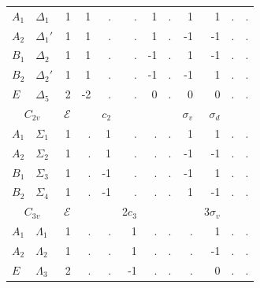 \documentclass[twocolumn,showpacs,preprintnumbers,superscriptaddress,prb,floatfix,aps,10pt]{revtex4-1}
\newcommand*{\id}{\mathcal{E}}
\begin{document}
\begin{table}
\begin{ruledtabular}
\begin{tabular*}{10cm}{llrrrrrrrrrr}
\hline
$A_1$           & $\Delta_{1}  $  &  1  &     1  &     .  &     .  &     1  &   .  &          1  &          1  &          .  &          .  \\         %
$A_2$           & $\Delta_{1}' $  &  1  &     1  &     .  &     .  &     1  &   .  &         -1  &         -1  &          .  &          .  \\         %
$B_1$           & $\Delta_{2}  $  &  1  &     1  &     .  &     .  &    -1  &   .  &          1  &         -1  &          .  &          .  \\         %
$B_2$           & $\Delta_{2}' $  &  1  &     1  &     .  &     .  &    -1  &   .  &         -1  &          1  &          .  &          .  \\         %
$E$             & $\Delta_{5}  $  &  2  &    -2  &     .  &     .  &     0  &   .  &          0  &          0  &          .  &          .  \\ \hline \hline %
\multicolumn{2}{c}{$C_{2v}$}      &$\id$&        &  $c_2$ &        &        &      &  $\sigma_v$ & $\sigma_d$  &             &             \\
\hline
$A_{1}$         & $\Sigma_{1}  $  &  1  &     .  &     1  &     .  &     .  &   .  &          1  &          1  &          .  &          .  \\
$A_{2}$         & $\Sigma_{2}  $  &  1  &     .  &     1  &     .  &     .  &   .  &         -1  &         -1  &          .  &          .  \\
$B_{1}$         & $\Sigma_{3}  $  &  1  &     .  &    -1  &     .  &     .  &   .  &         -1  &          1  &          .  &          .  \\
$B_{2}$         & $\Sigma_{4}  $  &  1  &     .  &    -1  &     .  &     .  &   .  &          1  &         -1  &          .  &          .  \\ \hline \hline
\multicolumn{2}{c}{$C_{3v}$}      &$\id$&        &        & 2$c_3$ &        &      &             & 3$\sigma_v$ &             &             \\
\hline
$A_{1}$         & $\Lambda_{1} $  &  1  &     .  &     .  &     1  &     .  &   .  &          .  &          1  &          .  &          .  \\
$A_{2}$         & $\Lambda_{2} $  &  1  &     .  &     .  &     1  &     .  &   .  &          .  &         -1  &          .  &          .  \\
$E$             & $\Lambda_{3} $  &  2  &     .  &     .  &    -1  &     .  &   .  &          .  &          0  &          .  &          .  \\ \hline \hline

\end{tabular*}
\end{ruledtabular}
\end{table}
\end{document}
